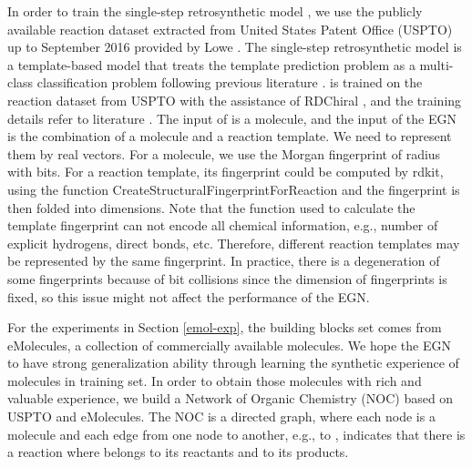 \documentclass[sn-mathphys,Numbered]{sn-jnl}
\begin{document}
In order to train the single-step retrosynthetic model , we use the publicly available reaction dataset extracted from United States Patent Office (USPTO) up to September 2016 provided by Lowe \cite{lowe2017}. The single-step retrosynthetic model  is a template-based model that treats the template prediction problem as a multi-class classification problem following previous literature \citep{Coley2017,Coley2017b}.  is trained on the reaction dataset from USPTO with the assistance of RDChiral \citep{Coley2019}, and the training details  refer to literature \citep{retro2020,2022}.
The input of  is a molecule, and the input of the EGN is the combination of a molecule and a reaction template. We need to represent them by real vectors. 
For a molecule, we use the Morgan fingerprint of radius  with  bits. For a reaction template, its fingerprint could be computed by rdkit, using the function CreateStructuralFingerprintForReaction and the fingerprint is then folded into  dimensions.
Note that the function used to calculate the template fingerprint can not encode all chemical information, e.g., number of explicit hydrogens, direct bonds, etc.
Therefore, different reaction templates may be represented by the same fingerprint.
In practice, there is a degeneration of some fingerprints because of bit collisions since the dimension of fingerprints is fixed, so this issue might not affect the performance of the EGN.

For the experiments in Section \ref{emol-exp},
the building blocks set  comes from eMolecules, a collection of  commercially available molecules. We hope the EGN to have strong generalization ability through learning the synthetic experience of molecules in training set. In order to obtain those molecules with rich and valuable experience, we build a Network of Organic Chemistry (NOC) \citep{NOC1,NOC2,NOC3} based on USPTO and eMolecules. 
The NOC is a directed graph, where each node is a molecule and each edge from one node to another, e.g.,  to , indicates that there is a reaction where  belongs to its reactants and  to its products. 
\end{document}
